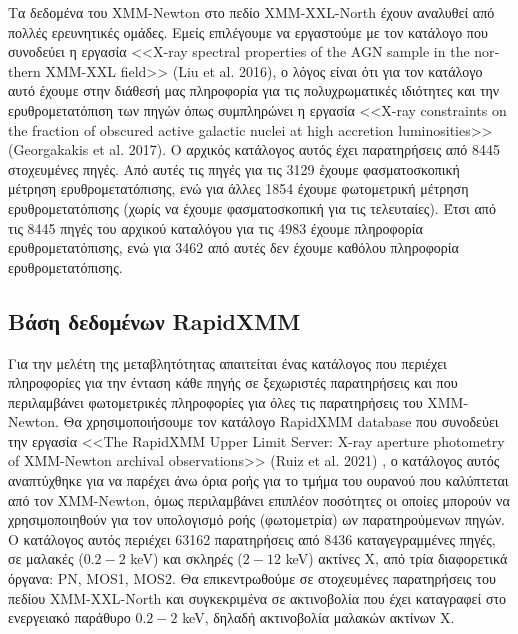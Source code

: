 Τα δεδομένα του \textlatin{XMM-Newton} στο πεδίο \textlatin{XMM-XXL-North} έχουν αναλυθεί από πολλές ερευνητικές ομάδες. Εμείς επιλέγουμε να εργαστούμε με τον κατάλογο που συνοδεύει η εργασία \textlatin{<<X-ray spectral properties of the AGN sample in the northern XMM-XXL field>> (Liu et al. 2016)}\cite{2016MNRAS.459.1602L}, ο λόγος είναι ότι για τον κατάλογο αυτό έχουμε στην διάθεσή μας πληροφορία για τις πολυχρωματικές ιδιότητες και την ερυθρομετατόπιση των πηγών όπως συμπληρώνει η εργασία  \textlatin{<<X-ray constraints on the fraction of obscured active galactic nuclei at high accretion luminosities>> (Georgakakis et al. 2017)}\cite{2017MNRAS.469.3232G}.
Ο αρχικός κατάλογος αυτός έχει παρατηρήσεις από 8445 στοχευμένες πηγές. Από αυτές τις πηγές για τις 3129 έχουμε φασματοσκοπική μέτρηση ερυθρομετατόπισης, ενώ για άλλες 1854 έχουμε φωτομετρική μέτρηση ερυθρομετατόπισης (χωρίς να έχουμε φασματοσκοπική για τις τελευταίες). Έτσι από τις 8445 πηγές του αρχικού καταλόγου για τις 4983 έχουμε πληροφορία ερυθρομετατόπισης, ενώ για 3462 από αυτές δεν έχουμε καθόλου πληροφορία ερυθρομετατόπισης.

\subsection{Βάση δεδομένων \textlatin{RapidXMM}}

Για την μελέτη της μεταβλητότητας απαιτείται ένας κατάλογος που περιέχει πληροφορίες για την ένταση κάθε πηγής σε ξεχωριστές παρατηρήσεις και που περιλαμβάνει φωτομετρικές πληροφορίες για όλες τις παρατηρήσεις του \textlatin{XMM-Newton}. 
Θα χρησιμοποιήσουμε τον κατάλογο \textlatin{RapidXMM database} που συνοδεύει την εργασία \textlatin{<<The RapidXMM Upper Limit Server: X-ray aperture photometry of XMM-Newton archival observations>> (Ruiz et al. 2021)} \cite{RapidXMM}, ο κατάλογος αυτός αναπτύχθηκε για να παρέχει άνω όρια ροής για το τμήμα του ουρανού που καλύπτεται από τον \textlatin{XMM-Newton}, όμως περιλαμβάνει επιπλέον ποσότητες οι οποίες μπορούν να χρησιμοποιηθούν για τον υπολογισμό ροής (φωτομετρία) ων παρατηρούμενων πηγών. Ο κατάλογος αυτός περιέχει 63162 παρατηρήσεις από 8436 καταγεγραμμένες πηγές, σε μαλακές ($0.2-2$ \textlatin{keV}) και σκληρές ($2-12$ \textlatin{keV}) ακτίνες Χ, από τρία διαφορετικά όργανα: \textlatin{PN, MOS1, MOS2}.  
Θα επικεντρωθούμε σε στοχευμένες παρατηρήσεις του πεδίου \textlatin{XMM-XXL-North} και συγκεκριμένα σε ακτινοβολία που έχει καταγραφεί στο ενεργειακό παράθυρο $0.2-2$ \textlatin{keV}, δηλαδή ακτινοβολία μαλακών ακτίνων Χ.

